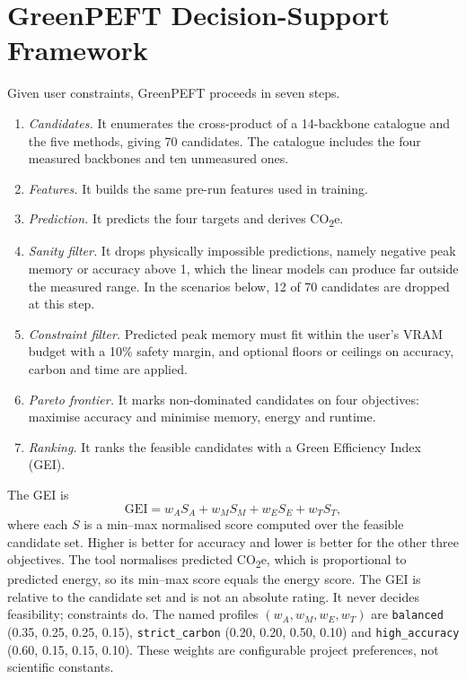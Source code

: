 \documentclass[conference]{IEEEtran}
\newcommand{\COtwo}{CO\textsubscript{2}e}
\begin{document}
\section{GreenPEFT Decision-Support Framework}

Given user constraints, GreenPEFT proceeds in seven steps. %
\begin{enumerate}
\item \emph{Candidates.} It enumerates the cross-product of a 14-backbone catalogue and the
five methods, giving 70 candidates. The catalogue includes the four measured backbones and
ten unmeasured ones.
\item \emph{Features.} It builds the same pre-run features used in training.
\item \emph{Prediction.} It predicts the four targets and derives \COtwo{}.
\item \emph{Sanity filter.} It drops physically impossible predictions, namely negative peak
memory or accuracy above 1, which the linear models can produce far outside the measured
range. In the scenarios below, 12 of 70 candidates are dropped at this step. %
\item \emph{Constraint filter.} Predicted peak memory must fit within the user's VRAM budget
with a 10\% safety margin, and optional floors or ceilings on accuracy, carbon and time are
applied.
\item \emph{Pareto frontier.} It marks non-dominated candidates on four objectives: maximise
accuracy and minimise memory, energy and runtime.
\item \emph{Ranking.} It ranks the feasible candidates with a Green Efficiency Index (GEI).
\end{enumerate}
The GEI is
\begin{equation}
\mathrm{GEI} = w_A S_A + w_M S_M + w_E S_E + w_T S_T,
\end{equation}
where each $S$ is a min--max normalised score computed over the feasible candidate set.
Higher is better for accuracy and lower is better for the other three objectives. The tool
normalises predicted \COtwo{}, which is proportional to predicted energy, so its min--max
score equals the energy score. The GEI is relative to the candidate set and is not an
absolute rating. It never decides feasibility; constraints do. The named profiles
$(w_A, w_M, w_E, w_T)$ are \texttt{balanced} (0.35, 0.25, 0.25, 0.15),
\texttt{strict\_carbon} (0.20, 0.20, 0.50, 0.10) and \texttt{high\_accuracy}
(0.60, 0.15, 0.15, 0.10). These weights are configurable project preferences, not scientific
constants. %
\end{document}
